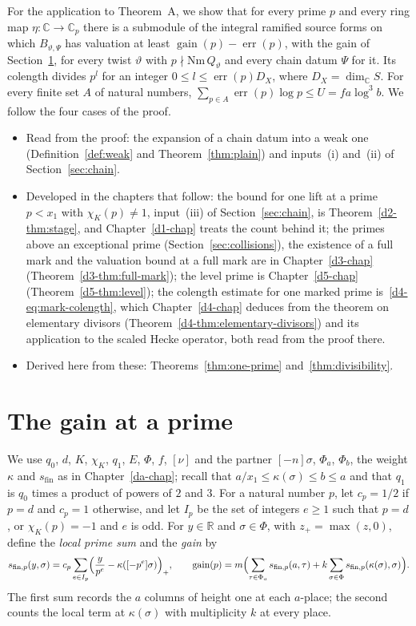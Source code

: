 \documentclass[reqno]{amsart}
\newcounter{chap}
\theoremstyle{definition}
\theoremstyle{plain}
\theoremstyle{definition}
\theoremstyle{remark}
\newcommand{\C}{{\mathbb{C}}}
\newcommand{\gain}{\operatorname{gain}}
\newcommand{\err}{\operatorname{err}}
\newcommand{\sfin}{s_{\mathrm{fin}}}
\newcommand{\sfp}{s_{\mathrm{fin},p}}
\newcommand{\Nm}{\mathrm{Nm}\,}
\begin{document}
\medskip
For the application to Theorem~A, we show that for every prime \(p\) and every ring map \(\eta\colon\C\to\C_p\) there is a submodule of the integral ramified source forms on which \(B_{\vartheta,\Psi}\) has valuation at least \(\gain(p)-\err(p)\), with the gain of Section~\ref{sec:gain}, for every twist \(\vartheta\) with \(p\nmid\Nm Q_\vartheta\) and every chain datum \(\Psi\) for it.  Its colength divides \(p^l\) for an integer \(0\le l\le\err(p)D_X\), where \(D_X=\dim_\C S\).  For every finite set \(A\) of natural numbers, \(\sum_{p\in A}\err(p)\log p\le U=fa\log^3 b\).  We follow the four cases of the proof.
\begin{itemize}
\item Read from the proof: the expansion of a chain datum into a weak one (Definition~\ref{def:weak} and Theorem~\ref{thm:plain}) and inputs~(i) and~(ii) of Section~\ref{sec:chain}.
\item Developed in the chapters that follow: the bound for one lift at a prime \(p < x_1\) with \(\chi_K(p) \ne 1\), input~(iii) of Section~\ref{sec:chain}, is Theorem~\ref{d2-thm:stage}, and Chapter~\ref{d1-chap} treats the count behind it; the primes above an exceptional prime (Section~\ref{sec:collisions}), the existence of a full mark and the valuation bound at a full mark are in Chapter~\ref{d3-chap} (Theorem~\ref{d3-thm:full-mark}); the level prime is Chapter~\ref{d5-chap} (Theorem~\ref{d5-thm:level}); the colength estimate for one marked prime is~\eqref{d4-eq:mark-colength}, which Chapter~\ref{d4-chap} deduces from the theorem on elementary divisors (Theorem~\ref{d4-thm:elementary-divisors}) and its application to the scaled Hecke operator, both read from the proof there.
\item Derived here from these: Theorems~\ref{thm:one-prime} and~\ref{thm:divisibility}.
\end{itemize}

\section{The gain at a prime}\label{sec:gain}

We use \(q_0\), \(d\), \(K\), \(\chi_K\), \(q_1\), \(E\), \(\Phi\), \(f\), \([\nu]\) and the partner \([-n]\sigma\), \(\Phi_a\), \(\Phi_b\), the weight \(\kappa\) and \(\sfin\) as in Chapter~\ref{da-chap}; recall that \(a/x_1 \le \kappa(\sigma) \le b \le a\) and that \(q_1\) is \(q_0\) times a product of powers of \(2\) and \(3\).  For a natural number \(p\), let \(c_p = 1/2\) if \(p = d\) and \(c_p = 1\) otherwise, and let \(I_p\) be the set of integers \(e \ge 1\) such that \(p = d\), or \(\chi_K(p) = -1\) and \(e\) is odd.  For \(y \in \mathbb R\) and \(\sigma \in \Phi\), with \(z_+ = \max(z, 0)\), define the \emph{local prime sum} and the \emph{gain} by
\[
  \sfp(y, \sigma) = c_p \sum_{e \in I_p} \Bigl(\frac{y}{p^e} - \kappa([-p^e]\sigma)\Bigr)_+ ,
  \qquad
  \gain(p) = m\Bigl(\sum_{\tau \in \Phi_a} \sfp(a, \tau) + k \sum_{\sigma \in \Phi} \sfp(\kappa(\sigma), \sigma)\Bigr) .
\]
The first sum records the \(a\) columns of height one at each \(a\)-place; the second counts the local term at \(\kappa(\sigma)\) with multiplicity \(k\) at every place.
\end{document}
